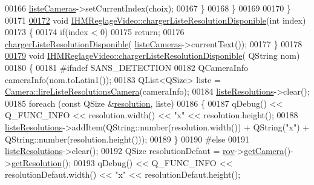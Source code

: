 \begin{DoxyCode}
00166            \hyperlink{class_i_h_m_reglage_video_a38a35548ddd0e5750917305ac6f32142}{listeCameras}->setCurrentIndex(choix);
00167        \}       
00168     \}
00169 
00170 \}
00171 
\hyperlink{class_i_h_m_reglage_video_a26dc15cf9453af24c464f0d6aebb42df}{00172} \textcolor{keywordtype}{void} \hyperlink{class_i_h_m_reglage_video_a26dc15cf9453af24c464f0d6aebb42df}{IHMReglageVideo::chargerListeResolutionDisponible}(\textcolor{keywordtype}{int}
       index)
00173 \{
00174     \textcolor{keywordflow}{if}(index < 0)
00175         \textcolor{keywordflow}{return};
00176     \hyperlink{class_i_h_m_reglage_video_a26dc15cf9453af24c464f0d6aebb42df}{chargerListeResolutionDisponible}(
      \hyperlink{class_i_h_m_reglage_video_a38a35548ddd0e5750917305ac6f32142}{listeCameras}->currentText());
00177 \}
00178 
\hyperlink{class_i_h_m_reglage_video_a25c0537f7d5b735f80f46f2ae993f424}{00179} \textcolor{keywordtype}{void} \hyperlink{class_i_h_m_reglage_video_a26dc15cf9453af24c464f0d6aebb42df}{IHMReglageVideo::chargerListeResolutionDisponible}(
      QString nom)
00180 \{
00181 \textcolor{preprocessor}{    #ifndef SANS\_DETECTION}
00182     QCameraInfo cameraInfo(nom.toLatin1());
00183     QList<QSize> liste = \hyperlink{class_camera_ac4756add4cb6bef60e38f3da79c2383f}{Camera::lireListeResolutionsCamera}(cameraInfo);
00184     \hyperlink{class_i_h_m_reglage_video_ad897355a4350d95f5f219db57ff68d4f}{listeResolutions}->clear();
00185     \textcolor{keywordflow}{foreach} (\textcolor{keyword}{const} QSize &\hyperlink{class_i_h_m_reglage_video_a7fd79309e9501b8cb340ae61b96c0366}{resolution}, liste)
00186     \{
00187         qDebug() << Q\_FUNC\_INFO << resolution.width() << \textcolor{stringliteral}{"x"} << resolution.height();
00188         \hyperlink{class_i_h_m_reglage_video_ad897355a4350d95f5f219db57ff68d4f}{listeResolutions}->addItem(QString::number(resolution.width()) + QString(\textcolor{stringliteral}{"x"}) + 
      QString::number(resolution.height()));
00189     \}
00190 \textcolor{preprocessor}{    #else}
00191     \hyperlink{class_i_h_m_reglage_video_ad897355a4350d95f5f219db57ff68d4f}{listeResolutions}->clear();
00192     QSize resolutionDefaut = \hyperlink{class_i_h_m_reglage_video_a755736fe361e651453de6bc21725a626}{rov}->\hyperlink{class_rov_ac1eeb568d39018359b89384c2ee6ee86}{getCamera}()->\hyperlink{class_camera_a9fae9d9b6fa352ff96c9874d9b085454}{getResolution}();
00193     qDebug() << Q\_FUNC\_INFO << resolutionDefaut.width() << \textcolor{stringliteral}{"x"} << resolutionDefaut.height();

\end{DoxyCode}
